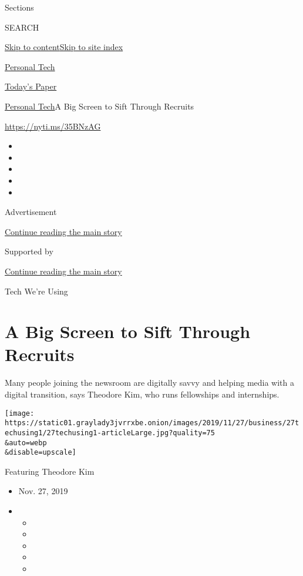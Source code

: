 Sections

SEARCH

\protect\hyperlink{site-content}{Skip to
content}\protect\hyperlink{site-index}{Skip to site index}

\href{https://www.nytimes3xbfgragh.onion/section/technology/personaltech}{Personal
Tech}

\href{https://myaccount.nytimes3xbfgragh.onion/auth/login?response_type=cookie\&client_id=vi}{}

\href{https://www.nytimes3xbfgragh.onion/section/todayspaper}{Today's
Paper}

\href{/section/technology/personaltech}{Personal Tech}\textbar{}A Big
Screen to Sift Through Recruits

\url{https://nyti.ms/35BNzAG}

\begin{itemize}
\item
\item
\item
\item
\item
\end{itemize}

Advertisement

\protect\hyperlink{after-top}{Continue reading the main story}

Supported by

\protect\hyperlink{after-sponsor}{Continue reading the main story}

Tech We're Using

\hypertarget{a-big-screen-to-sift-through-recruits}{%
\section{A Big Screen to Sift Through
Recruits}\label{a-big-screen-to-sift-through-recruits}}

Many people joining the newsroom are digitally savvy and helping media
with a digital transition, says Theodore Kim, who runs fellowships and
internships.

\texttt{[image: https://static01.graylady3jvrrxbe.onion/images/2019/11/27/business/27techusing1/27techusing1-articleLarge.jpg?quality=75\\\&auto=webp\\\&disable=upscale]}

Featuring Theodore Kim

\begin{itemize}
\item
  Nov. 27, 2019
\item
  \begin{itemize}
  \item
  \item
  \item
  \item
  \item
  \end{itemize}
\end{itemize}

